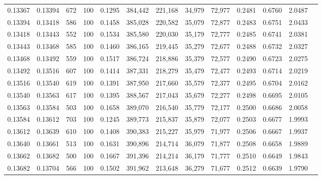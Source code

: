 \begin{tabular}{rrrrrrrrrrrrr}
0.13367 & 0.13394 &   672 & 100 &                                     0.1295 & 384,442 & 221,168 &  34,979 &  72,977 & 0.2481 & 0.6760 & 2.0487 \\
0.13394 & 0.13418 &   586 & 100 &                                     0.1458 & 385,028 & 220,582 &  35,079 &  72,877 & 0.2483 & 0.6751 & 2.0433 \\
0.13418 & 0.13443 &   552 & 100 &                                     0.1534 & 385,580 & 220,030 &  35,179 &  72,777 & 0.2485 & 0.6741 & 2.0381 \\
0.13443 & 0.13468 &   585 & 100 &                                     0.1460 & 386,165 & 219,445 &  35,279 &  72,677 & 0.2488 & 0.6732 & 2.0327 \\
0.13468 & 0.13492 &   559 & 100 &                                     0.1517 & 386,724 & 218,886 &  35,379 &  72,577 & 0.2490 & 0.6723 & 2.0275 \\
0.13492 & 0.13516 &   607 & 100 &                                     0.1414 & 387,331 & 218,279 &  35,479 &  72,477 & 0.2493 & 0.6714 & 2.0219 \\
0.13516 & 0.13540 &   619 & 100 &                                     0.1391 & 387,950 & 217,660 &  35,579 &  72,377 & 0.2495 & 0.6704 & 2.0162 \\
0.13540 & 0.13563 &   617 & 100 &                                     0.1395 & 388,567 & 217,043 &  35,679 &  72,277 & 0.2498 & 0.6695 & 2.0105 \\
0.13563 & 0.13584 &   503 & 100 &                                     0.1658 & 389,070 & 216,540 &  35,779 &  72,177 & 0.2500 & 0.6686 & 2.0058 \\
0.13584 & 0.13612 &   703 & 100 &                                     0.1245 & 389,773 & 215,837 &  35,879 &  72,077 & 0.2503 & 0.6677 & 1.9993 \\
0.13612 & 0.13639 &   610 & 100 &                                     0.1408 & 390,383 & 215,227 &  35,979 &  71,977 & 0.2506 & 0.6667 & 1.9937 \\
0.13640 & 0.13661 &   513 & 100 &                                     0.1631 & 390,896 & 214,714 &  36,079 &  71,877 & 0.2508 & 0.6658 & 1.9889 \\
0.13662 & 0.13682 &   500 & 100 &                                     0.1667 & 391,396 & 214,214 &  36,179 &  71,777 & 0.2510 & 0.6649 & 1.9843 \\
0.13682 & 0.13704 &   566 & 100 &                                     0.1502 & 391,962 & 213,648 &  36,279 &  71,677 & 0.2512 & 0.6639 & 1.9790 \\

\end{tabular}
